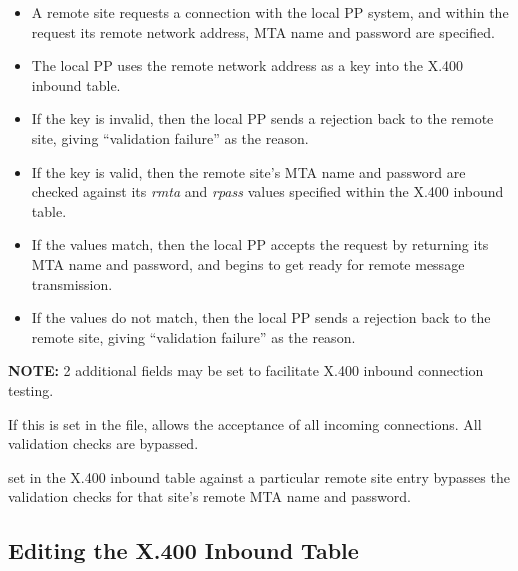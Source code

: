 \begin{itemize}
\item A remote site requests a connection with the local PP system, 
and within the request its remote network address, MTA name and 
password are specified. 

\item The local PP uses the remote network address as a key into 
the X.400 inbound table. 

\item If the key is invalid, then the local PP sends a rejection 
back to the remote site, giving ``validation failure'' as the reason.

\item If the key is valid, then the remote site's MTA name 
and password are checked against its {\em rmta} and {\em rpass} 
values specified within the X.400 inbound table. 

\item If the values match, then the local PP accepts the request
by returning its MTA name and password, and begins to get ready 
for remote message transmission.

\item If the values do not match, then the local PP sends a rejection 
back to the remote site, giving ``validation failure'' as the reason.
\end{itemize}

{\bf NOTE:} 2 additional fields may be set to facilitate 
X.400 inbound connection testing. 

\begin{describe}

\item[\verb|ininfo=sloppy|:] If this is set in the  file,
allows the acceptance of all incoming connections. All validation
checks are bypassed.

\item[\verb|other=sloppy|:] set in the X.400 inbound table
against a particular remote site entry bypasses the  
validation checks for that site's remote MTA name and password.
\end{describe}

\subsection{Editing the X.400 Inbound Table} 

